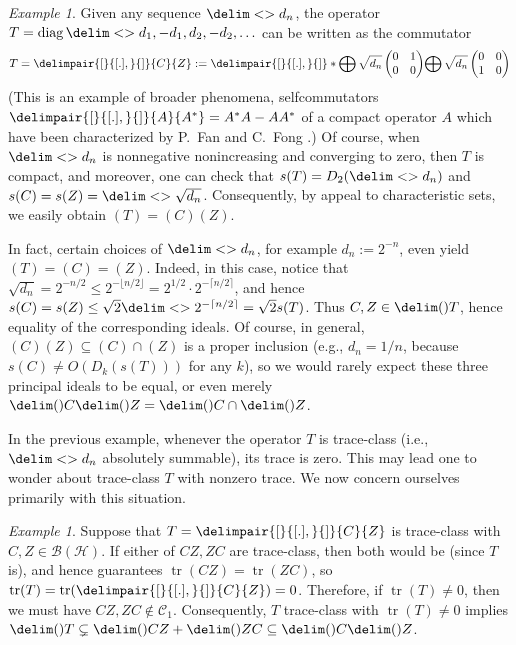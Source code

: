 \documentclass[10pt,reqno]{amsart}
\theoremstyle{remark}
\newtheorem{example}[theorem]{Example}
\newcommand{\BH}{\mathcal{B}(\Hil)}
\newcommand{\Hil}{\mathcal{H}}
\DeclareMathOperator{\diag}{diag}
\DeclareMathOperator{\trace}{tr}
\newcommand{\seq}{\delim<>}
\newcommand{\ideal}{\delim()}
\newcommand{\comm}{\delimpair{[}{[.],}{]}}
\newcommand{\schatten}[1]{\mathcal{C}_{#1}}
\newcommand{\traceclass}{\schatten{1}}
\numberwithin{equation}{section}
\begin{document}
\begin{example}
  \label{ex:containment-equality}
  Given any sequence $\seq{d_n}$, the operator $T = \diag{\seq{d_1, -d_1, d_2, -d_2, \ldots}}$ can be written as the commutator
  \begin{equation*}
    T = \comm{C}{Z} := \comm*{\bigoplus \sqrt{d_n}\left(\begin{matrix} 0 & 1\\ 0 & 0 \end{matrix}\right)}{\bigoplus \sqrt{d_n}\left(\begin{matrix} 0 & 0\\ 1 & 0 \end{matrix}\right)}
  \end{equation*}
  (This is an example of broader phenomena, selfcommutators $\comm{A}{A^*} = A^*A-AA^*$ of a compact operator $A$ which have been characterized by P.~Fan and C.~Fong \cite[Theorem 1]{FF-1980-PAMS}.)
  Of course, when $\seq{d_n}$ is nonnegative nonincreasing and converging to zero, then $T$ is compact, and moreover, one can check that $s(T) = D_2 (\seq{d_n})$ and $s(C) = s(Z) = \seq{\sqrt{d_n}}$.
  Consequently, by appeal to characteristic sets, we easily obtain $(T) = (C)(Z)$.

  In fact, certain choices of $\seq{d_n}$, for example $d_n := 2^{-n}$, even yield $(T) = (C) = (Z)$.
  Indeed, in this case, notice that $\sqrt{d_n} = 2^{-n/2} \le 2^{-\lfloor n/2 \rfloor} = 2^{1/2} \cdot 2^{-\lceil n/2 \rceil}$, and hence $s(C) = s(Z) \le \sqrt{2} \seq{2^{-\lceil n/2 \rceil}} = \sqrt{2} s(T)$.
  Thus $C,Z \in \ideal{T}$, hence equality of the corresponding ideals.
  Of course, in general, $(C)(Z) \subseteq (C) \cap (Z)$ is a proper inclusion (e.g., $d_n = 1/n$, because $s(C) \neq O(D_k(s(T)))$ for any $k$), so we would rarely expect these three principal ideals to be equal, or even merely $\ideal{C} \ideal{Z} = \ideal{C} \cap \ideal{Z}$.
\end{example}

In the previous example, whenever the operator $T$ is trace-class (i.e., $\seq{d_n}$ absolutely summable), its trace is zero.
This may lead one to wonder about trace-class $T$ with nonzero trace.
We now concern ourselves primarily with this situation.

\begin{example}
  \label{ex:trace-class-nonzero-trace}
  Suppose that $T = \comm{C}{Z}$ is trace-class with $C,Z \in \BH$.
  If either of $CZ, ZC$ are trace-class, then both would be (since $T$ is), and hence \cite[Lemma~2.1]{LNRR-1981-JRAM} guarantees $\trace(CZ) = \trace(ZC)$, so $\trace(T) = \trace(\comm{C}{Z}) = 0$.
  Therefore, if $\trace(T) \neq 0$, then we must have $CZ, ZC \notin \traceclass$.
  Consequently, $T$ trace-class with $\trace(T) \neq 0$ implies $\ideal{T} \subsetneq \ideal{CZ} + \ideal{ZC} \subseteq \ideal{C}\ideal{Z}$.
\end{example}
\end{document}
